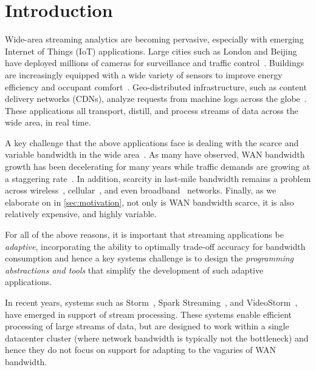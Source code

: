 \section{Introduction}

Wide-area streaming analytics are becoming pervasive, especially with emerging
Internet of Things (IoT) applications. Large cities such as London and Beijing
have deployed millions of cameras for surveillance and traffic
control~\cite{skynet, london.surveillance}. Buildings are increasingly equipped
with a wide variety of sensors to improve energy efficiency and occupant
comfort~\cite{krioukov2012building}. Geo-distributed infrastructure, such as
content delivery networks (CDNs), analyze requests from machine logs across the
globe~\cite{mukerjee2015practical}. These applications all transport, distill,
and process streams of data across the wide area, in real time.

A key challenge that the above applications face is dealing with the scarce and
variable bandwidth in the wide area~\cite{hsieh17gaia, vulimiri2015global}.  As
many have observed, WAN bandwidth growth has been decelerating for many years
while traffic demands are growing at a staggering
rate~\cite{global2016telegeography, cisco2013zettabyte, cisco2016global}.  In
addition, scarcity in last-mile bandwidth remains a problem across
wireless~\cite{biswas2015large}, cellular~\cite{nikravesh2014mobile}, and even
broadband~\cite{grover2013peeking, sundaresan2014bismark} networks.  Finally, as
we elaborate on in \autoref{sec:motivation}, not only is WAN bandwidth scarce,
it is also relatively expensive, and highly variable.

For all of the above reasons, it is important that streaming applications be
\emph{adaptive}, incorporating the ability to optimally trade-off accuracy for
bandwidth consumption and hence a key systems challenge is to design the
\emph{programming abstractions and tools} that simplify the development of such
adaptive applications.

In recent years, systems such as Storm~\cite{toshniwal2014storm}, Spark
Streaming~\cite{zaharia2013discretized}, and VideoStorm~\cite{zhang2017live},
have emerged in support of stream processing.  These systems enable efficient
processing of large streams of data, but are designed to work within a single
datacenter cluster (where network bandwidth is typically not the bottleneck) and
hence they do not focus on support for adapting to the vagaries of WAN
bandwidth.


